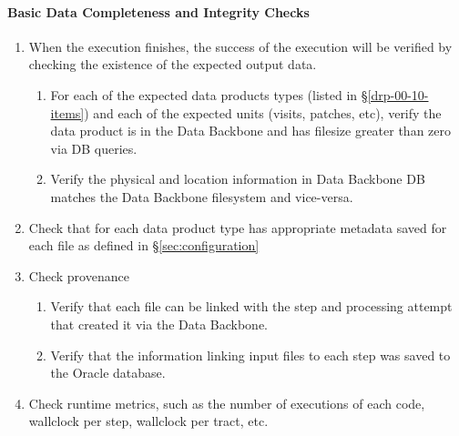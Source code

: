 \paragraph{Basic Data Completeness and Integrity Checks}\label{sec:basic_checks}
\begin{enumerate}
  \item{When the execution finishes, the success of the execution will be verified by checking the existence of the expected output data.}
    \begin{enumerate}

       \item{For each of the expected data products types (listed
       in \S\ref{drp-00-10-items}) and each of the expected units
       (visits, patches, etc), verify the data product is in the 
       Data Backbone and has filesize greater than zero via DB 
       queries.}

       \item{Verify the physical and location information in Data
       Backbone DB matches the Data Backbone filesystem and
       vice-versa.}

    \end{enumerate}
  \item{Check that for each data product type has appropriate metadata saved for each file as defined in \S\ref{sec:configuration}}
  \item{Check provenance}
    \begin{enumerate}
        \item{Verify that each file can be linked with the step and processing attempt that created it via the Data Backbone.}
        \item{Verify that the information linking input files to each step was saved to the Oracle database.}
    \end{enumerate}
  \item{Check runtime metrics, such as the number of executions of each code, wallclock per step, wallclock per tract,
        etc.}
\end{enumerate}

